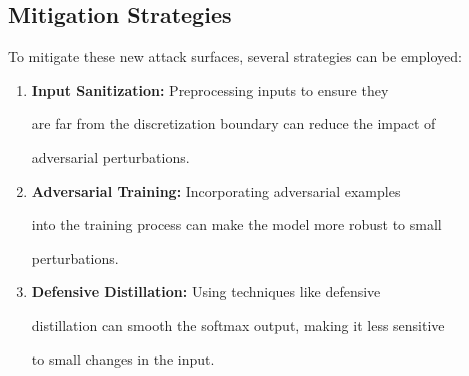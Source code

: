 \subsection{Mitigation Strategies}













To mitigate these new attack surfaces, several strategies can be employed:













\begin{enumerate}






    \item \textbf{Input Sanitization:} Preprocessing inputs to ensure they






    are far from the discretization boundary can reduce the impact of






    adversarial perturbations.






    






    \item \textbf{Adversarial Training:} Incorporating adversarial examples






    into the training process can make the model more robust to small






    perturbations.






    






    \item \textbf{Defensive Distillation:} Using techniques like defensive






    distillation can smooth the softmax output, making it less sensitive






    to small changes in the input.






\end{enumerate}
